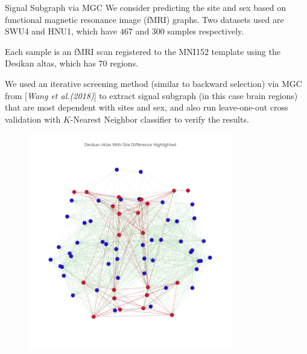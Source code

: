 \documentclass[mathserif,t]{beamer}
\newcommand{\Mgc}{MGC}
\begin{document}
\begin{frame}{Signal Subgraph via MGC}
\pause
We consider predicting the site and sex based on functional magnetic resonance image (fMRI) graphs. Two datasets used are SWU4 and HNU1, which have $467$ and $300$ samples respectively. \\
\medskip

Each sample is an fMRI scan registered to the MNI152 template using the Desikan altas, which has $70$ regions. \\
\medskip

We used an iterative screening method (similar to backward selection) via MGC from [\textit{Wang et al.(2018)}] to extract signal subgraph (in this case brain regions) that are most dependent with sites and sex, and also run leave-one-out cross validation with $K$-Nearest Neighbor classifier to verify the results.

\end{frame}


\begin{frame}
\begin{figure}[!ht]
	\centering
	\includegraphics[width=3.5in]{brain.png}
	\label{fig:study}
\end{figure}
\end{frame}
\end{document}
